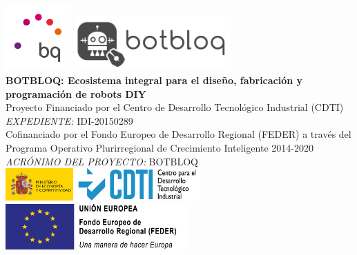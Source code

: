 \documentclass[12pt]{article} %
\begin{document}

\begin{titlepage}

\newcommand{\HRule}{\rule{\linewidth}{0.5mm}} %

\center %

\includegraphics[width=2.5cm]{logo}
\includegraphics[width=6cm]{logo_botbloq.jpg}\\[0.5cm]

{ \huge \bfseries BOTBLOQ: Ecosistema integral para el diseño, fabricación y programación de robots DIY}\\[0.5cm] %

\textsc Proyecto Financiado por el Centro de Desarrollo Tecnológico Industrial (CDTI) \\
\textsc{\small \emph{EXPEDIENTE:} IDI-20150289} \\
\textsc Cofinanciado por el Fondo Europeo de Desarrollo Regional (FEDER) a través del Programa Operativo Plurirregional de Crecimiento Inteligente 2014-2020 \\[0.5cm]
{\small \emph{ACRÓNIMO DEL PROYECTO:} BOTBLOQ}\\[0.5cm] %

\includegraphics[width=7.5cm]{CDTI}
\includegraphics[width=7cm]{FEDER}\\[1.0cm]


\end{titlepage}
\end{document}

